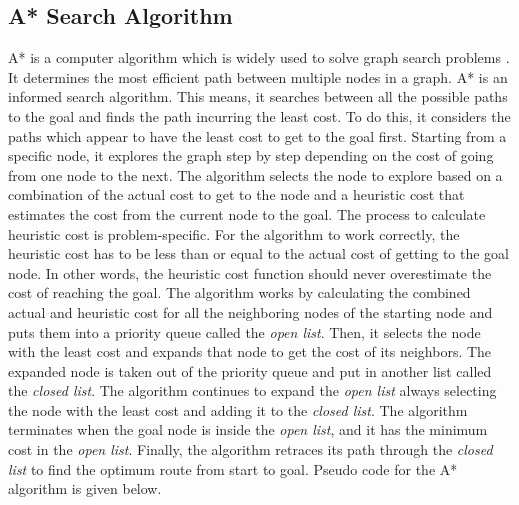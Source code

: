 
\subsection{A* Search Algorithm}
A* is a computer algorithm which is widely used to solve graph search problems \cite{a8book}. It determines the most efficient path between multiple nodes in a graph. A* is an informed search algorithm. This means, it searches between all the possible paths to the goal and finds the path incurring the least cost. To do this, it considers the paths which appear to have the least cost to get to the goal first. Starting from a specific node, it explores the graph step by step depending on the cost of going from one node to the next. The algorithm selects the node to explore based on a combination of the actual cost to get to the node and a heuristic cost that estimates the cost from the current node to the goal. The process to calculate heuristic cost is problem-specific. For the algorithm to work correctly, the heuristic cost has to be less than or equal to the actual cost of getting to the goal node. In other words, the heuristic cost function should never overestimate the cost of reaching the goal. The algorithm works by calculating the combined actual and heuristic cost for all the neighboring nodes of the starting node and puts them into a priority queue called the \textit{open list}. Then, it selects the node with the least cost and expands that node to get the cost of its neighbors. The expanded node is taken out of the priority queue and put in another list called the \textit{closed list}. The algorithm continues to expand the \textit{open list} always selecting the node with the least cost and adding it to the \textit{closed list}. The algorithm terminates when the goal node is inside the \textit{open list}, and it has the minimum cost in the \textit{open list}. Finally, the algorithm retraces its path through the \textit{closed list} to find the optimum route from start to goal. Pseudo code for the A* algorithm is given below.


